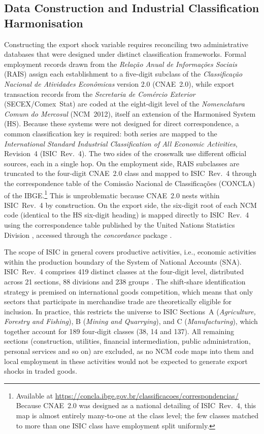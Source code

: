 \documentclass[
	11pt,				%
	oneside,			%
	a4paper,			%
	english,			%
	english				%
	]{abntex2ppgsi}
\theoremstyle{plain}
\theoremstyle{remark}
\theoremstyle{plain}%
\theoremstyle{remark}%
\begin{document}
\begin{apendicesenv}
\chapter{Data Construction and Industrial Classification Harmonisation}
\label{ch:data-construction-industrial-classification}


Constructing the export shock variable requires reconciling two administrative
databases that were designed under distinct classification frameworks. Formal
employment records drawn from the \textit{Relação Anual de Informações Sociais}
(RAIS) assign each establishment to a five-digit subclass of the
\textit{Classificação Nacional de Atividades Econômicas} version 2.0
(CNAE~2.0), while export transaction records from the \textit{Secretaria de
Comércio Exterior} (SECEX/Comex~Stat) are coded at the eight-digit level of the
\textit{Nomenclatura Comum do Mercosul} (NCM~2012), itself an extension of the
Harmonised System (HS). Because these systems were not designed for direct
correspondence, a common classification key is required: both series are mapped to the
\textit{International Standard Industrial Classification of All Economic
Activities}, Revision~4 (ISIC~Rev.~4). The two sides of the crosswalk use different official
sources, each in a single hop. On the employment side, RAIS subclasses are
truncated to the four-digit CNAE~2.0 class and mapped to ISIC~Rev.~4 through
the correspondence table of the Comissão Nacional de Classificações (CONCLA)
of the IBGE.\footnote{Available at
\url{https://concla.ibge.gov.br/classificacoes/correspondencias/} Because
CNAE~2.0 was designed as a national detailing of ISIC~Rev.~4, this map is
almost entirely many-to-one at the class level; the few classes matched to
more than one ISIC class have employment split uniformly.} This is
unproblematic because CNAE~2.0 nests within ISIC~Rev.~4 by construction. On
the export side, the six-digit root of each NCM code (identical to the HS
six-digit heading) is mapped directly to ISIC~Rev.~4 using the
correspondence table published by the United Nations Statistics Division
\cite{ISIC}, accessed through the \textit{concordance} package
\cite{concordance2020}.

The scope of ISIC in general covers productive activities, i.e., economic
activities within the production boundary of the System of National Accounts (SNA).
ISIC~Rev.~4 comprises 419 distinct classes at the four-digit level, distributed
across 21 sections, 88 divisions and 238 groups \cite{ISIC}. 
The shift-share identification strategy is premised on international goods competition, which means that only sectors that participate in merchandise trade are
theoretically eligible for inclusion. In practice, this restricts the universe
to ISIC Sections~A (\textit{Agriculture, Forestry and Fishing}), B
(\textit{Mining and Quarrying}), and C (\textit{Manufacturing}), which together
account for 189 four-digit classes (38, 14 and 137). All remaining sections (construction, utilities, financial intermediation, public administration, personal services and so on) are excluded, as no NCM code maps into them and local employment in these activities would not be expected to generate export shocks in traded goods.


\end{apendicesenv}
\end{document}
